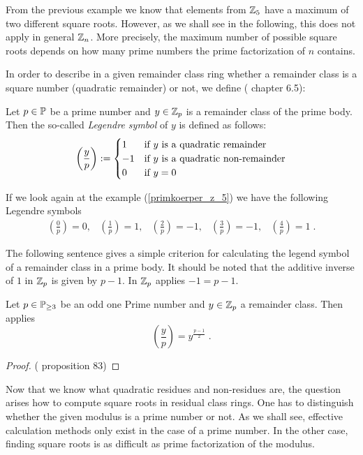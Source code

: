 From the previous example we know that elements from $ \mathbb{Z}_5 $ have a maximum of two different square roots. However, as we shall see in the following, this does not apply in general $ \mathbb{Z}_n $. More precisely, the maximum number of possible square roots depends on how many prime numbers the prime factorization of $ n $ contains.

In order to describe in a given remainder class ring whether a remainder class is a square number (quadratic remainder) or not, we define (\cite{HW} chapter 6.5):
\begin{definition}  Let $ p \in \mathbb{P} $ be a prime number and
$ y \in \mathbb{Z}_p $ is a remainder class of the prime body. Then the so-called \textit{Legendre symbol} of $ y $ is defined as follows:
\begin{equation}
\label{eq: Legendre-symbol}
\left (\frac{y}{p} \right): =
\begin{cases}
1 & \text{if $ y $ is a quadratic remainder} \\
-1 & \text{if $ y $ is a quadratic non-remainder} \\
0 & \text{if $ y = 0 $}
\end{cases}
\end{equation}
\end{definition}
\begin{example}
If we look again at the example (\ref{primkoerper_z_5}) we have the following Legendre symbols
$$
\begin{array}{ccccc}
\left (\frac{0}{p} \right) = 0, &
\left (\frac{1}{p} \right) = 1, &
\left (\frac{2}{p} \right) = -1, &
\left (\frac{3}{p} \right) = -1, &
\left (\frac{4}{p} \right) = 1 \;.
\end{array}
$$
\end{example}


The following sentence gives a simple criterion for calculating the legend symbol of a remainder class in a prime body. It should be noted that the additive inverse of $ 1 $ in $ \mathbb{Z}_p $ is given by $ p-1 $. In $ \mathbb{Z}_p $ applies $ -1 = p-1 $.
\begin{theorem}  Let $ p \in \mathbb{P}_{\geq 3} $ be an odd one
Prime number and $ y \in \mathbb{Z}_p $ a remainder class. Then applies
\begin{equation}
\label{eq: Euler_criterium}
\left (\frac{y}{p} \right) = y^{\frac{p-1}{2}} \;.
\end{equation}
\end{theorem}
\begin{proof} (\cite{HW} proposition 83) 
\end{proof}
Now that we know what quadratic residues and non-residues are,
the question arises how to compute square roots in residual class rings. One has to distinguish whether the given modulus is a prime number or not. As we shall see, effective calculation methods only exist in the case of a prime number. In the other case, finding square roots is as difficult as prime factorization of the modulus.

